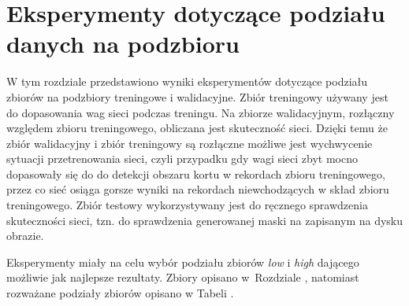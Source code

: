 \section{Eksperymenty dotyczące podziału danych na podzbioru}
\label{sec:podzial_eksperyment}

W tym rozdziale przedstawiono wyniki eksperymentów dotyczące podziału zbiorów na podzbiory treningowe i walidacyjne.
Zbiór treningowy używany jest do dopasowania wag sieci podczas treningu.
Na zbiorze walidacyjnym, rozłączny względem zbioru treningowego, obliczana jest skuteczność sieci.
Dzięki temu że zbiór walidacyjny i zbiór treningowy są rozłączne możliwe jest wychwycenie sytuacji przetrenowania sieci, czyli przypadku gdy wagi sieci zbyt mocno dopasowały się do do detekcji obszaru kortu w rekordach zbioru treningowego, przez co sieć osiąga gorsze wyniki na rekordach niewchodzących w skład zbioru treningowego.
Zbiór testowy wykorzystywany jest do ręcznego sprawdzenia skuteczności sieci, tzn. do sprawdzenia generowanej maski na zapisanym na dysku obrazie.

Eksperymenty miały na celu wybór podziału zbiorów \textit{low} i \textit{high} dającego możliwie jak najlepsze rezultaty. Zbiory opisano w~Rozdziale , natomiast rozważane podziały zbiorów opisano w Tabeli .
